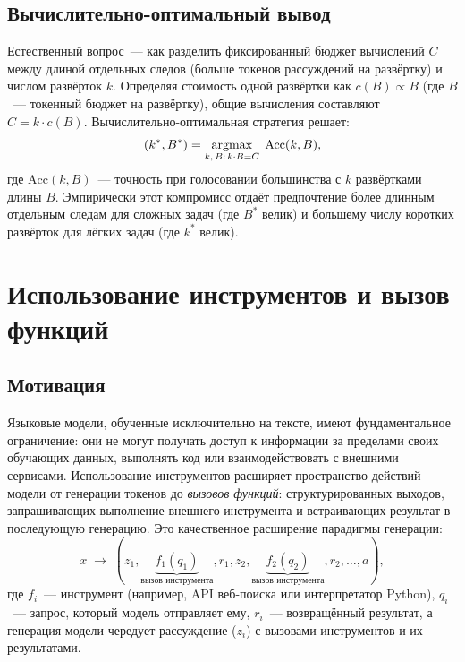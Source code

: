\subsection{Вычислительно-оптимальный вывод}
\label{subsec:compute-optimal}

Естественный вопрос~--- как разделить фиксированный бюджет вычислений $C$ между
длиной отдельных следов (больше токенов рассуждений на развёртку)
и числом развёрток $k$. Определяя стоимость одной развёртки как
$c(B) \propto B$ (где $B$~--- токенный бюджет на развёртку), общие
вычисления составляют $C = k \cdot c(B)$. Вычислительно-оптимальная стратегия
решает:
\[
(k^*, B^*) = \operatorname*{argmax}_{k,\,B:\,k\cdot B = C}\; \text{Acc}(k, B),
\]
где $\text{Acc}(k, B)$~--- точность при голосовании большинства с $k$
развёртками длины $B$. Эмпирически этот компромисс отдаёт предпочтение более длинным
отдельным следам для сложных задач (где $B^*$ велик) и большему числу
коротких развёрток для лёгких задач (где $k^*$ велик).

\section{Использование инструментов и вызов функций}
\label{sec:tool-use}

\subsection{Мотивация}

Языковые модели, обученные исключительно на тексте, имеют фундаментальное ограничение:
они не могут получать доступ к информации за пределами своих обучающих данных, выполнять
код или взаимодействовать с внешними сервисами. Использование инструментов
расширяет пространство действий модели от генерации токенов до
\emph{вызовов функций}: структурированных выходов, запрашивающих выполнение
внешнего инструмента и встраивающих результат в последующую генерацию.
Это качественное расширение парадигмы генерации:
\begin{equation}
\label{eq:tool-loop}
x \;\longrightarrow\; (z_1, \underbrace{f_1(q_1)}_{\text{вызов инструмента}},
r_1, z_2, \underbrace{f_2(q_2)}_{\text{вызов инструмента}}, r_2, \ldots, a),
\end{equation}
где $f_i$~--- инструмент (например, API веб-поиска или интерпретатор Python),
$q_i$~--- запрос, который модель отправляет ему, $r_i$~--- возвращённый результат,
а генерация модели чередует рассуждение ($z_i$)
с вызовами инструментов и их результатами.

